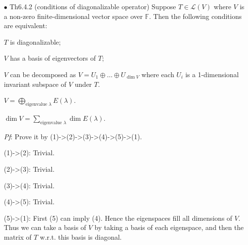 \documentclass{article}
\begin{document}
\begin{Th}{$\bullet$ Th6.4.2 (conditions of diagonalizable operator)}
    Suppose $T\in\mathcal{L}(V)$ where $V$ is a non-zero finite-dimensional vector space over $\mathbb{F}$. Then the following conditions are equivalent:
    \begin{compactenum}
        \item $T$ is diagonalizable;
        \item $V$ has a basis of eigenvectors of $T$;
        \item $V$ can be decomposed as $V = U_1\oplus \dots \oplus U_{\dim V}$ where each $U_i$ is a 1-dimensional invariant subspace of $V$ under $T$.
        \item $V = \bigoplus_{\text{eigenvalue }\lambda} E(\lambda)$.
        \item $\dim V = \sum_{\text{eigenvalue }\lambda} \dim E(\lambda)$.
    \end{compactenum}
    \tcblower
    \textit{Pf}: Prove it by (1)->(2)->(3)->(4)->(5)->(1).
    \begin{compactitem}
        \item (1)->(2): Trivial.
        \item (2)->(3): Trivial.
        \item (3)->(4): Trivial.
        \item (4)->(5): Trivial.
        \item (5)->(1): First (5) can imply (4). Hence the eigenspaces fill all dimensions of $V$. Thus we can take a basis of $V$ by taking a basis of each eigenspace, and then the matrix of $T$ w.r.t. this basis is diagonal.
    \end{compactitem}
\end{Th}
\end{document}

